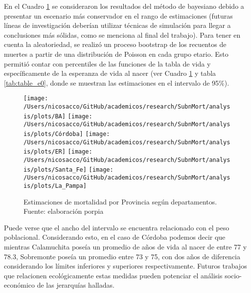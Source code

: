 \documentclass[12pt,spanish,]{article}
\begin{document}
En el Cuadro \ref{fig:jerarq} se consideraron los resultados del método
de bayesiano debido a presentar un escenario más conservador en el rango
de estimaciones (futuras líneas de investigación deberían utilizar
técnicas de simulación para llegar a conclusiones más sólidas, como se
menciona al final del trabajo). Para tener en cuenta la aleatoriedad, se
realizó un proceso bootstrap de los recuentos de muertes a partir de una
distribución de Poisson en cada grupo etario. Esto permitió contar con
percentiles de las funciones de la tabla de vida y específicamente de la
esperanza de vida al nacer (ver Cuadro \ref{fig:jerarq} y tabla
\ref{tab:table_e0}, donde se muestran las estimaciones en el intervalo
de 95\%).

\begin{figure}

{\centering \texttt{[image: /Users/nicosacco/GitHub/academicos/research/SubnMort/analysis/plots/BA]} \texttt{[image: /Users/nicosacco/GitHub/academicos/research/SubnMort/analysis/plots/Córdoba]} \texttt{[image: /Users/nicosacco/GitHub/academicos/research/SubnMort/analysis/plots/ER]} \texttt{[image: /Users/nicosacco/GitHub/academicos/research/SubnMort/analysis/plots/Santa\_Fe]} \texttt{[image: /Users/nicosacco/GitHub/academicos/research/SubnMort/analysis/plots/La\_Pampa]} 

}

\caption{Estimaciones de mortalidad por Provincia según departamentos. Fuente: elaboración porpia}\label{fig:jerarq}
\end{figure}

Puede verse que el ancho del intervalo se encuentra relacionado con el
peso poblacional. Considerando esto, en el caso de Córdoba podemos decir
que mientras Calamuchita poseía un promedio de años de vida al nacer de
entre 77 y 78.3, Sobremonte poseía un promedio entre 73 y 75, con dos
años de diferencia considerando los límites inferiores y superiores
respectivamente. Futuros trabajos que relacionen ecológicamente estas
medidas pueden potenciar el análisis socio-económico de las jerarquías
halladas.
\end{document}
